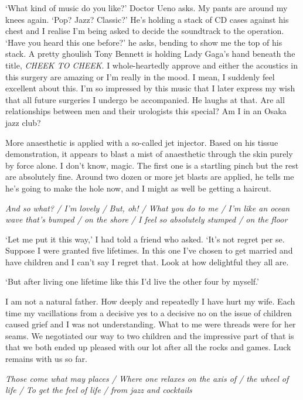\documentclass[12pt,a4paper,onecolumn]{letter}
\begin{document}
`What kind of music do you like?' Doctor Ueno asks. My pants are around my knees again. `Pop? Jazz? Classic?' He's holding a stack of CD cases against his chest and I realise I'm being asked to decide the soundtrack to the operation. `Have you heard this one before?' he asks, bending to show me the top of his stack. A pretty ghoulish Tony Bennett is holding Lady Gaga's hand beneath the title, {\it CHEEK TO CHEEK}. I whole-heartedly approve and either the acoustics in this surgery are amazing or I'm really in the mood. I mean, I suddenly feel excellent about this. I'm so impressed by this music that I later express my wish that all future surgeries I undergo be accompanied. He laughs at that. Are all relationships between men and their urologists this special? Am I in an Osaka jazz club?

More anaesthetic is applied with a so-called jet injector. Based on his tissue demonstration, it appears to blast a mist of anaesthetic through the skin purely by force alone. I don't know, magic. The first one is a startling pinch but the rest are absolutely fine. Around two dozen or more jet blasts are applied, he tells me he's going to make the hole now, and I might as well be getting a haircut.

\begin{center}
{\it And so what? / I'm lovely /
But, oh! / What you do to me /
I'm like an ocean wave that's bumped / on the shore /
I feel so absolutely stumped  / on the floor}
\end{center}

`Let me put it this way,' I had told a friend who asked. `It's not regret per se. Suppose I were granted five lifetimes. In this one I've chosen to get married and have children and I can't say I regret that. Look at how delightful they all are. 

`But after living one lifetime like this I'd live the other four by myself.'

I am not a natural father. How deeply and repeatedly I have hurt my wife. Each time my vacillations from a decisive yes to a decisive no on the issue of children caused grief and I was not understanding. What to me were threads were for her seams. We negotiated our way to two children and the impressive part of that is that we both ended up pleased with our lot after all the rocks and games. Luck remains with us so far.

\begin{center}
{\it Those come what may places /
Where one relaxes on the axis of / the wheel of life /
To get the feel of life / from jazz and cocktails}
\end{center}
\end{document}
